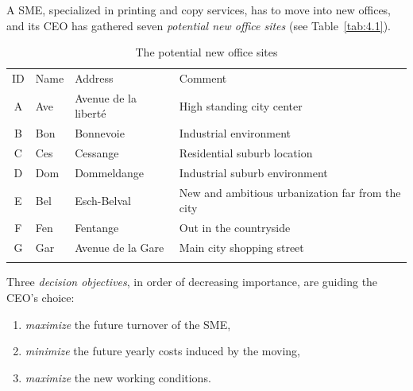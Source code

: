 A SME, specialized in printing and copy services, has to move into new offices, and its CEO has gathered seven \emph{potential new office sites} (see Table~\vref{tab:4.1}).
\begin{table}[h]
\caption{The potential new office sites}
\label{tab:4.1}       %
\begin{center}
    \begin{tabular}{c|l|l|l}
      \svhline\noalign{\smallskip}
      ID & Name & Address & Comment\\
      \noalign{\smallskip}\hline\noalign{\smallskip}
    A &   Ave  &  Avenue de la liberté &  High standing city center\\
    B &   Bon  &  Bonnevoie &             Industrial environment\\
    C &   Ces  &  Cessange &              Residential suburb location\\
    D &   Dom  &  Dommeldange &           Industrial suburb environment\\
    E &   Bel  &  Esch-Belval &           New and ambitious urbanization far from the city\\
    F &   Fen  &  Fentange &              Out in the countryside\\
      G &   Gar  &  Avenue de la Gare &     Main city shopping street\\
      \noalign{\smallskip}\hline
    \end{tabular}
\end{center}
\end{table}

Three \emph{decision objectives}, in order of decreasing importance, are guiding the CEO's choice:
\begin{enumerate}[leftmargin=1cm]
\item \emph{maximize} the future turnover of the SME,
\item \emph{minimize} the future yearly costs induced by the moving,
\item \emph{maximize} the new working conditions.
\end{enumerate}


